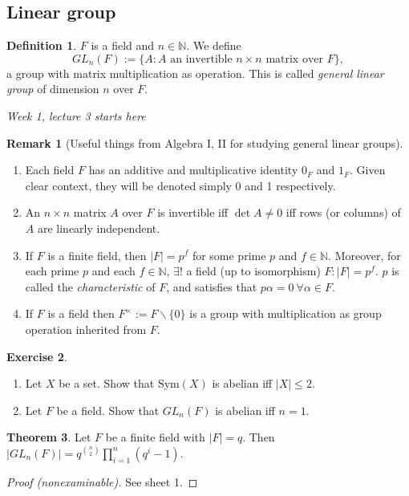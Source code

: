 \documentclass[a4paper]{article}
\newcommand{\N}{\mathbb{N}}
\newcommand{\Sym}{\text{Sym}}
\theoremstyle{definition}
\newtheorem{defn}{Definition}[subsection]
\newtheorem{thm}[defn]{Theorem}
\newtheorem{exe}[defn]{Exercise}
\newtheorem*{remark}{Remark}
\begin{document}
\subsection{Linear group}
\begin{defn}
$F$ is a field and $n\in \N$. We define
\[
GL_n(F) := \{A:A\text{ an invertible }n\times n \text{ matrix over } F\},
\]
a group with matrix multiplication as operation. This is called \textit{general linear group} of dimension $n$ over $F$.
\end{defn}
\begin{flushright}
\textit{Week 1, lecture 3 starts here}
\end{flushright}

\begin{remark}[Useful things from Algebra I, II for studying general linear groups]
\begin{enumerate}
\item Each field $F$ has an additive and multiplicative identity $0_F$ and $1_F$. Given clear context, they will be denoted simply 0 and 1 respectively.
\item An $n\times n$ matrix $A$ over $F$ is invertible iff $\det A\neq 0$ iff rows (or columns) of $A$ are linearly independent.
\item If $F$ is a finite field, then $|F|=p^f$ for some prime $p$ and $f\in\N$. Moreover, for each prime $p$ and each $f\in\N$, $\exists!$ a field (up to isomorphism) $F:|F|=p^f$. $p$ is called the \textit{characteristic} of $F$, and satisfies that $p\alpha=0 \ \forall \alpha\in F$.
\item If $F$ is a field then $F^{\times}:=F\backslash \{0\}$ is a group with multiplication as group operation inherited from $F$.
\end{enumerate}
\end{remark}
\begin{exe}
\begin{enumerate}
\item Let $X$ be a set. Show that $\Sym(X)$ is abelian iff $|X|\leq 2$.
\item Let $F$ be a field. Show that $GL_n(F)$ is abelian iff $n=1$.
\end{enumerate}
\end{exe}
\begin{thm}
\label{thm:orderofGLnF}
Let $F$ be a finite field with $|F|=q$. Then $\displaystyle |GL_n(F)|=q^{\binom{n}{2}} \prod_{i=1}^n (q^i-1)$.
\end{thm}
\begin{proof}[Proof (nonexaminable)]
See sheet 1. 
\end{proof}
\end{document}
